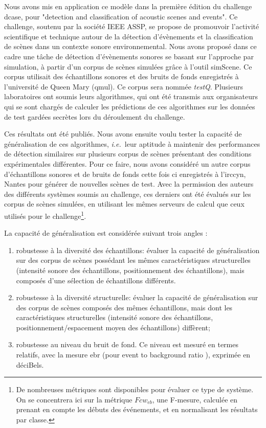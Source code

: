   Nous avons mis en application ce modèle dans la première édition du challenge dcase, pour "detection and classification of acoustic scenes and events". Ce challenge, soutenu par la société IEEE ASSP, se propose de promouvoir l'activité scientifique et technique autour de la détection d'évènements et la classification de scènes dans un contexte sonore environnemental. Nous avons proposé dans ce cadre une tâche de détection d'évènements sonores se basant sur l'approche par simulation, à partir d'un corpus de scènes simulées grâce à l'outil simScene. Ce corpus utilisait des échantillons sonores et des bruits de fonds enregistrés à l'université de Queen Mary (qmul). Ce corpus sera nommée \emph{testQ}. Plusieurs laboratoires ont soumis leurs algorithmes, qui ont été transmis aux organisateurs qui se sont chargés de calculer les prédictions de ces algorithmes sur les données de test gardées secrètes lors du déroulement du challenge.

  Ces résultats ont été publiés\cite{stowellhal-01253912}. Nous avons ensuite voulu tester la capacité de généralisation de ces algorithmes, \textit{i.e.}~leur aptitude à maintenir des performances de détection similaires sur plusieurs corpus de scènes présentant des conditions expérimentales différentes. Pour ce faire, nous avons considéré un autre corpus d'échantillons sonores et de bruits de fonds  cette fois ci enregistrés à l'irccyn, Nantes pour générer de nouvelles scènes de test. Avec la permission des auteurs des différents systèmes soumis au challenge, ces derniers ont été évalués sur les corpus de scènes simulées, en utilisant les mêmes serveurs de calcul que ceux utilisés pour le challenge\footnote{De nombreuses métriques sont disponibles pour évaluer ce type de système. On se concentrera ici sur la métrique $Fcw_{eb}$, une F-mesure, calculée en prenant en compte les débuts des événements, et en normalisant les résultats par classe.}.

  La capacité de généralisation est considérée suivant trois angles :
  \begin{enumerate}
    \item robustesse à la diversité des échantillons: évaluer la capacité de généralisation sur des corpus de scènes possédant les mêmes caractéristiques structurelles (intensité sonore des échantillons, positionnement des échantillons), mais composés d'une sélection de échantillons différents.
    \item robustesse à la diversité structurelle: évaluer la capacité de généralisation sur des corpus de scènes composés des mêmes échantillons, mais dont les caractéristiques structurelles (intensité sonore des échantillons, positionnement/espacement moyen des échantillons) diffèrent;
    \item robustesse au niveau du bruit de fond. Ce niveau est mesuré en termes relatifs, avec la mesure ebr (pour \og event to background ratio \fg), exprimée en déciBels.
  \end{enumerate}

